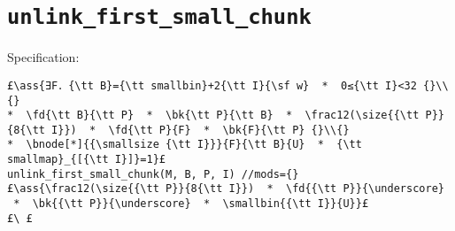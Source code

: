 \documentclass[10pt,a4paper,twoside]{report}
\makeatletter
\newcommand{\ml}[2][t]{\mbox{\mdseries\begin{tabular}[#1]{@{}L@{}}#2\end{tabular}}}
\newcommand{\ass}[1]{\ensuremath{{\color{blue}\left\{\ml[c]{#1}\right\}}}}
\makeatother
\begin{document}
\section{{\tt unlink\_first\_small\_chunk}}

Specification:
\begin{lstlisting}
£\ass{∃F．{\tt B}={\tt smallbin}+2{\tt I}{\sf w}  *  0≤{\tt I}<32 {}\\{}
*  \fd{\tt B}{\tt P}  *  \bk{\tt P}{\tt B}  *  \frac12(\size{{\tt P}}{8{\tt I}})  *  \fd{\tt P}{F}  *  \bk{F}{\tt P} {}\\{}
*  \bnode[*]{{\smallsize {\tt I}}}{F}{\tt B}{U}  *  {\tt smallmap}_{[{\tt I}]}=1}£
unlink_first_small_chunk(M, B, P, I) //mods={}
£\ass{\frac12(\size{{\tt P}}{8{\tt I}})  *  \fd{{\tt P}}{\underscore}  *  \bk{{\tt P}}{\underscore}  *  \smallbin{{\tt I}}{U}}£
£\ £
\end{lstlisting}
\end{document}
